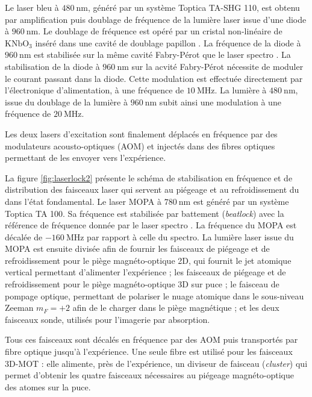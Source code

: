 Le laser bleu à $\SI{480}{\nano\meter}$, généré par un système Toptica TA-SHG 110, est obtenu par amplification puis doublage de fréquence de la lumière laser issue d'une diode à $\SI{960}{\nano\meter}$. Le doublage de fréquence est opéré par un cristal non-linéaire de $\mathrm{KNbO_3}$ inséré dans une cavité de doublage \og papillon \fg{}. La fréquence de la diode à $\SI{960}{\nano\meter}$ est stabilisée sur la même cavité Fabry-Pérot que le laser \og spectro \fg{}.
La stabilisation de la diode à $\SI{960}{\nano\meter}$ sur la acvité Fabry-Pérot nécessite de moduler le courant passant dans la diode. Cette modulation est effectuée directement par l'électronique d'alimentation, à une fréquence de $\SI{10}{\MHz}$.
La lumière à $\SI{480}{\nano\meter}$, issue du doublage de la lumière à $\SI{960}{\nano\meter}$ subit ainsi une modulation à une fréquence de $\SI{20}{\MHz}$.

Les deux lasers d'excitation sont finalement déplacés en fréquence par des modulateurs acousto-optiques (AOM) et injectés dans des fibres optiques permettant de les envoyer vers l'expérience.

La figure \eqref{fig:laserlock2} présente le schéma de stabilisation en fréquence et de distribution des faisceaux laser qui servent au piégeage et au refroidissement du  dans l'état fondamental.
Le laser \og MOPA \fg{} à $\SI{780}{\nano\meter}$ est généré par un système Toptica TA 100.
Sa fréquence est stabilisée par battement (\textit{beatlock}) avec la référence de fréquence donnée par le laser \og spectro \fg{}.
La fréquence du MOPA est décalée de $\SI{-160}{\MHz}$ par rapport à celle du spectro.
La lumière laser issue du MOPA est ensuite divisée afin de fournir les faisceaux de piégeage et de refroidissement pour le piège magnéto-optique 2D, qui fournit le jet atomique vertical permettant d'alimenter l'expérience ;
les faisceaux de piégeage et de refroidissement pour le piège magnéto-optique 3D sur puce ;
le faisceau de pompage optique, permettant de polariser le nuage atomique dans le sous-niveau Zeeman $m_F=+2$ afin de le charger dans le piège magnétique ;
et les deux faisceaux sonde, utilisés pour l'imagerie par absorption.

Tous ces faisceaux sont décalés en fréquence par des AOM puis transportés par fibre optique jusqu'à l'expérience.
Une seule fibre est utilisé pour les faisceaux \og 3D-MOT \fg{} : elle alimente, près de l'expérience, un diviseur de faisceau (\textit{cluster}) qui permet d'obtenir les quatre faisceaux nécessaires au piégeage magnéto-optique des atomes sur la puce.

